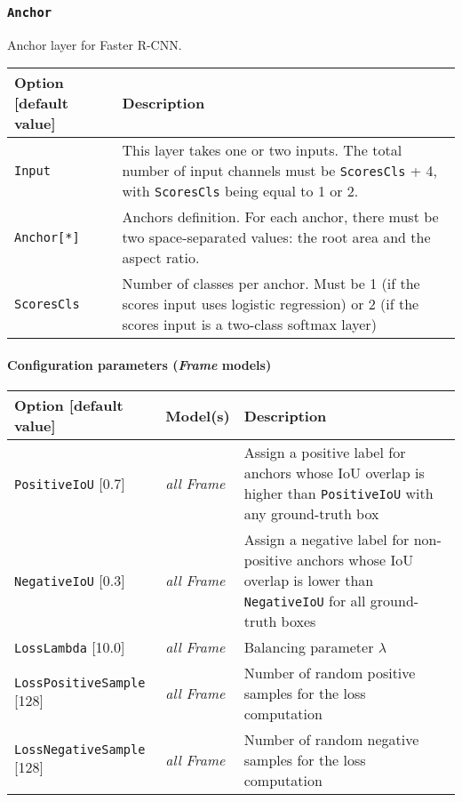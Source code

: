 \documentclass[a4paper,11pt,oneside]{article}
\begin{document}
\subsubsection{\texorpdfstring{%
\lstinline[basicstyle=\ttfamily\bfseries]!Anchor!}{Anchor}}
Anchor layer for Faster R-CNN.

\begin{center}
 \begin{longtable}{| p{5cm} | p{10cm} | }
 \hline
 Option [default value] & Description\\
 \hline\hline
  \cellcolor{requiredcolor}\lstinline!Input! & This layer takes one or two
  inputs. The total number of input channels must be \lstinline!ScoresCls! + 4,
  with \lstinline!ScoresCls! being equal to 1 or 2. \\
  \cellcolor{requiredcolor}\lstinline!Anchor[*]! & Anchors definition. For each
  anchor, there must be two space-separated values: the root area and the aspect
   ratio. \\
  \lstinline!ScoresCls! & Number of classes per anchor. Must be 1 (if the scores
  input uses logistic regression) or 2 (if the scores input is a two-class
  softmax layer) \\
 \hline
\end{longtable}
\end{center}

\paragraph{Configuration parameters (\emph{Frame} models)}

\begin{center}
 \begin{longtable}{| p{4cm} | p{3cm} | p{9cm} | }
 \hline
 Option [default value] & Model(s) & Description\\
 \hline\hline
  \lstinline!PositiveIoU! [0.7] & \emph{all Frame} &  Assign a positive label
  for anchors whose IoU overlap is higher than \lstinline!PositiveIoU! with any
   ground-truth box \\
  \lstinline!NegativeIoU! [0.3] & \emph{all Frame} & Assign a negative label
  for non-positive anchors whose IoU overlap is lower than
  \lstinline!NegativeIoU! for all ground-truth boxes \\
  \lstinline!LossLambda! [10.0] & \emph{all Frame} & Balancing parameter $\lambda$ \\
  \lstinline!LossPositiveSample! [128] & \emph{all Frame} & Number of random
  positive samples for the loss computation \\
  \lstinline!LossNegativeSample! [128] & \emph{all Frame} & Number of random
  negative samples for the loss computation \\
 \hline
\end{longtable}
\end{center}
\end{document}
